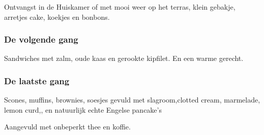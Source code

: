 Ontvangst in de Huiskamer of met mooi weer op het terras,
klein gebakje, arretjes cake,  koekjes en bonbons.

\subsubsection*{De volgende gang}

Sandwiches met zalm, oude kaas en gerookte kipfilet.
En een warme gerecht.

\subsubsection*{De laatste gang}
Scones, muffins, brownies, soesjes gevuld met slagroom,clotted cream, marmelade, lemon curd,, en natuurlijk echte Engelse pancake’s

Aangevuld met onbeperkt thee en koffie.
